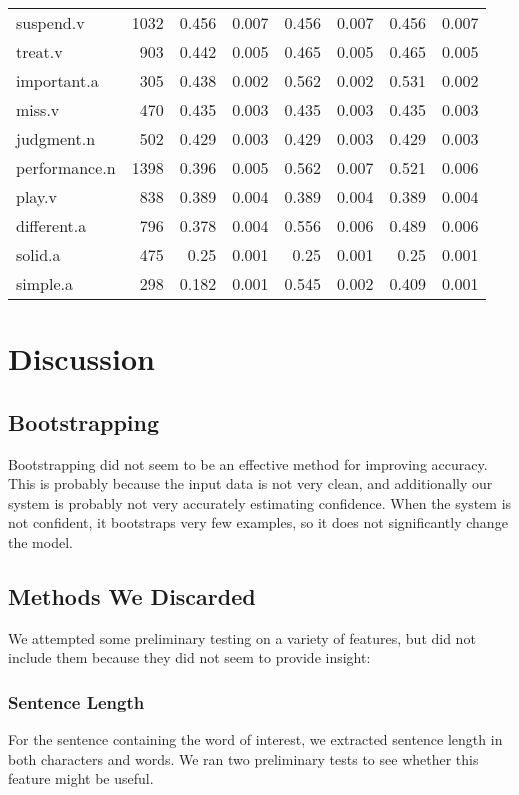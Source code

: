 \documentclass{article}
\begin{document}
\begin{longtable}{l | r r r r r r r}
suspend.v	&	1032	&	0.456	&	0.007	&	0.456	&	0.007	&	0.456	&	0.007\\
treat.v	&	903	&	0.442	&	0.005	&	0.465	&	0.005	&	0.465	&	0.005\\
important.a	&	305	&	0.438	&	0.002	&	0.562	&	0.002	&	0.531	&	0.002\\
miss.v	&	470	&	0.435	&	0.003	&	0.435	&	0.003	&	0.435	&	0.003\\
judgment.n	&	502	&	0.429	&	0.003	&	0.429	&	0.003	&	0.429	&	0.003\\
performance.n	&	1398	&	0.396	&	0.005	&	0.562	&	0.007	&	0.521	&	0.006\\
play.v	&	838	&	0.389	&	0.004	&	0.389	&	0.004	&	0.389	&	0.004\\
different.a	&	796	&	0.378	&	0.004	&	0.556	&	0.006	&	0.489	&	0.006\\
solid.a	&	475	&	0.25	&	0.001	&	0.25	&	0.001	&	0.25	&	0.001\\
simple.a	&	298	&	0.182	&	0.001	&	0.545	&	0.002	&	0.409	&	0.001\\

\end{longtable}


\section{Discussion}

\subsection{Bootstrapping}

Bootstrapping did not seem to be an effective method for improving accuracy.  This is probably because the input data is not very clean, and additionally our system is probably not very accurately estimating confidence.  When the system is not confident, it bootstraps very few examples, so it does not significantly change the model.

\subsection{Methods We Discarded}

We attempted some preliminary testing on a variety of features, but did not include them because they did not seem to provide insight:

\subsubsection{Sentence Length} For the sentence containing the word of
interest, we extracted sentence length in both characters and words. We ran two
preliminary tests to see whether this feature might be useful.
\end{document}
